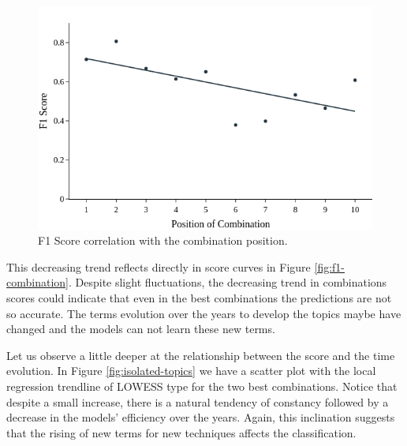 \begin{figure}[h!]
	\centering
	\includegraphics[width=0.6\linewidth]{01.Chapters/05.Results/combination-corr}
	\caption{F1 Score correlation with the combination position.}
	\label{fig:combination-corr}
\end{figure}

This decreasing trend reflects directly in score curves in Figure \ref{fig:f1-combination}. Despite slight fluctuations, the decreasing trend in combinations scores could indicate that even in the best combinations the predictions are not so accurate. The terms evolution over the years to develop the topics maybe have changed and the models can not learn these new terms.

Let us observe a little deeper at the relationship between the score and the time evolution. In Figure \ref{fig:isolated-topics} we have a scatter plot with the local regression trendline of LOWESS type for the two best combinations. Notice that despite a small increase, there is a natural tendency of constancy followed by a decrease in the models' efficiency over the years. Again, this inclination suggests that the rising of new terms for new techniques affects the classification.

